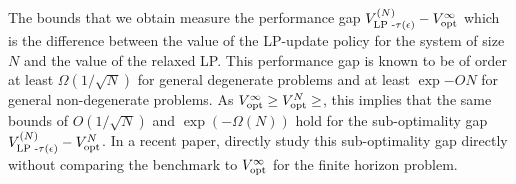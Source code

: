 The bounds that we obtain measure the performance gap $V_{\text{LP -}\tau(\epsilon)}^{(N)}-V_{\text{opt}}^{\infty}$ which is the difference between the value of the LP-update policy for the system of size $N$ and the value of the relaxed LP. This performance gap is known to be of order at least $\Omega(1/\sqrt{N})$ for general degenerate problems and at least $\exp{-O{N}}$ for general non-degenerate problems.  As $V_{\text{opt}}^{\infty}\ge V_{\text{opt}}^{N}\ge$, this implies that the same bounds of $O(1/\sqrt{N})$ and $\exp(-\Omega(N))$ hold for the sub-optimality gap $V_{\text{LP -}\tau(\epsilon)}^{(N)}-V_{\text{opt}}^{N}$.  In a recent paper, \cite{yan2024optimalgap} directly study this sub-optimality gap directly without comparing the benchmark to $V_{\text{opt}}^{\infty}$ for the finite horizon problem.

